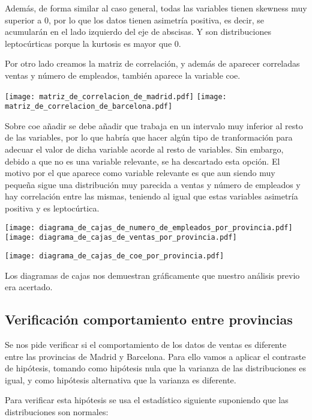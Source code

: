 \documentclass{article}
\begin{document}
Además, de forma similar al caso general, todas las variables tienen skewness muy superior a 0, por lo que los datos tienen asimetría positiva, es decir, se acumularán en el lado izquierdo del eje de abscisas. Y son distribuciones leptocúrticas porque la kurtosis es mayor que 0.

Por otro lado creamos la matriz de correlación, y además de aparecer correladas ventas y número de empleados, también aparece la variable coe.

\texttt{[image: matriz\_de\_correlacion\_de\_madrid.pdf]}
\texttt{[image: matriz\_de\_correlacion\_de\_barcelona.pdf]}
\FloatBarrier

Sobre coe añadir se debe añadir que trabaja en un intervalo muy inferior al resto de las variables, por lo que habría que hacer algún tipo de tranformación para adecuar el valor de dicha variable acorde al resto de variables. Sin embargo, debido a que no es una variable relevante, se ha descartado esta opción. El motivo por el que aparece como variable relevante es que aun siendo muy pequeña sigue una distribución muy parecida a ventas y número de empleados y hay correlación entre las mismas, teniendo al igual que estas variables asimetría positiva y es leptocúrtica.

\texttt{[image: diagrama\_de\_cajas\_de\_numero\_de\_empleados\_por\_provincia.pdf]}
\texttt{[image: diagrama\_de\_cajas\_de\_ventas\_por\_provincia.pdf]}
\FloatBarrier
\begin{center}
\texttt{[image: diagrama\_de\_cajas\_de\_coe\_por\_provincia.pdf]}
\FloatBarrier
\end{center}

Los diagramas de cajas nos demuestran gráficamente que nuestro análisis previo era acertado.

\subsection{Verificación comportamiento entre provincias}

Se nos pide verificar si el comportamiento de los datos de ventas es diferente entre las provincias de Madrid y Barcelona. Para ello vamos a aplicar el contraste de hipótesis, tomando como hipótesis nula que la varianza de las distribuciones es igual, y como hipótesis alternativa que la varianza es diferente.

Para verificar esta hipótesis se usa el estadístico siguiente suponiendo que las distribuciones son normales:
\end{document}
